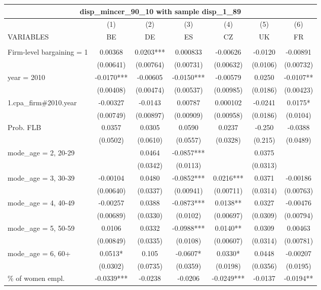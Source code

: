 \documentclass[]{article}
\begin{document}
\begin{tabular}{lcccccc}
\multicolumn{7}{c}{disp\_mincer\_90\_10 with sample disp\_1\_89} \\ \hline
 & (1) & (2) & (3) & (4) & (5) & (6) \\
VARIABLES & BE & DE & ES & CZ & UK & FR \\ \hline
 &  &  &  &  &  &  \\
Firm-level bargaining = 1 & 0.00368 & 0.0203*** & 0.000833 & -0.00626 & -0.0120 & -0.00891 \\
 & (0.00641) & (0.00764) & (0.00731) & (0.00632) & (0.0106) & (0.00732) \\
year = 2010 & -0.0170*** & -0.00605 & -0.0150*** & -0.00579 & 0.0250 & -0.0107** \\
 & (0.00408) & (0.00474) & (0.00537) & (0.00985) & (0.0186) & (0.00423) \\
1.cpa\_firm\#2010.year & -0.00327 & -0.0143 & 0.00787 & 0.000102 & -0.0241 & 0.0175* \\
 & (0.00749) & (0.00897) & (0.00909) & (0.00958) & (0.0186) & (0.0104) \\
Prob. FLB & 0.0357 & 0.0305 & 0.0590 & 0.0237 & -0.250 & -0.0388 \\
 & (0.0502) & (0.0610) & (0.0557) & (0.0328) & (0.215) & (0.0489) \\
mode\_age = 2, 20-29 &  & 0.0464 & -0.0857*** &  & 0.0375 &  \\
 &  & (0.0342) & (0.0113) &  & (0.0313) &  \\
mode\_age = 3, 30-39 & -0.00104 & 0.0480 & -0.0852*** & 0.0216*** & 0.0371 & -0.00186 \\
 & (0.00640) & (0.0337) & (0.00941) & (0.00711) & (0.0314) & (0.00763) \\
mode\_age = 4, 40-49 & -0.00257 & 0.0388 & -0.0873*** & 0.0138** & 0.0327 & -0.00476 \\
 & (0.00689) & (0.0330) & (0.0102) & (0.00697) & (0.0309) & (0.00794) \\
mode\_age = 5, 50-59 & 0.0106 & 0.0332 & -0.0988*** & 0.0140** & 0.0309 & 0.00463 \\
 & (0.00849) & (0.0335) & (0.0108) & (0.00607) & (0.0314) & (0.00781) \\
mode\_age = 6, 60+ & 0.0513* & 0.105 & -0.0607* & 0.0330* & 0.0448 & -0.00207 \\
 & (0.0302) & (0.0735) & (0.0359) & (0.0198) & (0.0356) & (0.0195) \\
\% of women empl. & -0.0339*** & -0.0238 & -0.0206 & -0.0249*** & -0.0137 & -0.0194** \\

\end{tabular}
\end{document}
